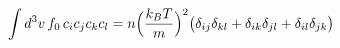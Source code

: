 \documentclass[preview]{standalone}
\begin{document}
\begin{align*}
\special{dvisvgm:raw <g id='unique000'>}\int d^3v\,f_0\,c_ic_jc_kc_l=n\Big(\frac{k_BT}{m}\Big)^{2}\big(\delta_{ij}\delta_{kl}+\delta_{ik}\delta_{jl}+\delta_{il}\delta_{jk}\big)\special{dvisvgm:raw </g>}
\end{align*}
\end{document}
